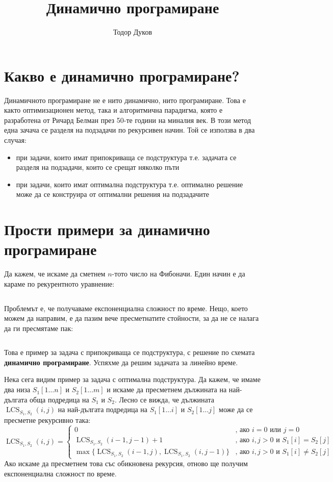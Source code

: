 \documentclass{article}
\title{Динамично програмиране}
\author{Тодор Дуков}
\date{}
\theoremstyle{definition}
\theoremstyle{plain}
\theoremstyle{remark}
\theoremstyle{definition}
\begin{document}
\maketitle

\section*{Какво е динамично програмиране?}

Динамичното програмиране не е нито динамично, нито програмиране.
Това е както оптимизационен метод, така и алгоритмична парадигма, която е разработена от Ричард Белман през 50-те години на миналия век.
В този метод една зачача се разделя на подзадачи по рекурсивен начин.
Той се използва в два случая:
\begin{itemize}
    \item при задачи, които имат припокриваща се подструктура т.е. задачата се разделя на подзадачи, които се срещат няколко пъти
    \item при задачи, които имат оптимална подструктура т.е. оптимално решение може да се конструира от оптимални решения на подзадачите
\end{itemize}

\section*{Прости примери за динамично програмиране}

Да кажем, че искаме да сметнем $n$-тото число на Фибоначи.
Един начин е да караме по рекурентното уравнение:
\inputminted[linenos]{c++}{algorithms/fibonacci_recursive.cpp}
Проблемът е, че получаваме експоненциална сложност по време.
Нещо, което можем да направим, е да пазим вече пресметнатите стойности, за да не се налага да ги пресмятаме пак:
\inputminted[linenos]{c++}{algorithms/fibonacci_dp.cpp}
Това е пример за задача с припокриваща се подструктура, с решение по схемата \textbf{динамично програмиране}.
Успяхме да решим задачата за линейно време.

Нека сега видим пример за задача с оптимална подструктура.
Да кажем, че имаме два низа $S_1[1 \dots n]$ и $S_2[1 \dots m]$ и искаме да пресметнем дължината на най-дългата обща подредица на $S_1$ и $S_2$.
Лесно се вижда, че дължината $\operatorname{LCS}_{S_1, S_2}(i, j)$ на най-дългата подредица на $S_1[1 \dots i]$ и $S_2[1 \dots j]$ може да се пресметне рекурсивно така:
\[
    \operatorname{LCS}_{S_1, S_2}(i, j) = \begin{cases}
        0                                                                                          & \text{, ако } i = 0 \text{ или } j = 0               \\
        \operatorname{LCS}_{S_1, S_2}(i - 1, j - 1) + 1                                            & \text{, ако } i, j > 0 \text{ и } S_1[i] = S_2[j]    \\
        \max\{ \operatorname{LCS}_{S_1, S_2}(i - 1, j), \operatorname{LCS}_{S_1, S_2}(i, j - 1) \} & \text{, ако } i, j > 0 \text{ и } S_1[i] \neq S_2[j]
    \end{cases}
\]
Ако искаме да пресметнем това със обикновена рекурсия, отново ще получим експоненциална сложност по време.
\end{document}
